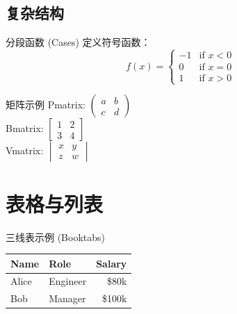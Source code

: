 \documentclass[UTF8]{ctexart}
\begin{document}
	\subsection{复杂结构}
	
	\begin{code-top}{分段函数 (Cases)}
		定义符号函数：
		\[
		f(x) = 
		\begin{cases} 
			-1 & \text{if } x < 0 \\
			0  & \text{if } x = 0 \\
			1  & \text{if } x > 0
		\end{cases}
		\]
	\end{code-top}
	
	\begin{code-left}[lefthand width=0.6\textwidth]{矩阵示例}
		Pmatrix: $\begin{pmatrix} a & b \\ c & d \end{pmatrix}$ \\[5pt]
		Bmatrix: $\begin{bmatrix} 1 & 2 \\ 3 & 4 \end{bmatrix}$ \\[5pt]
		Vmatrix: $\begin{vmatrix} x & y \\ z & w \end{vmatrix}$
	\end{code-left}
	
	\section{表格与列表}
	
	\begin{code-top}{三线表示例 (Booktabs)}
		\begin{tabular}{llr}
			\toprule
			Name & Role & Salary \\
			\midrule
			Alice & Engineer & \$80k \\
			Bob   & Manager  & \$100k \\
			\bottomrule
		\end{tabular}
	\end{code-top}
	
\end{document}
